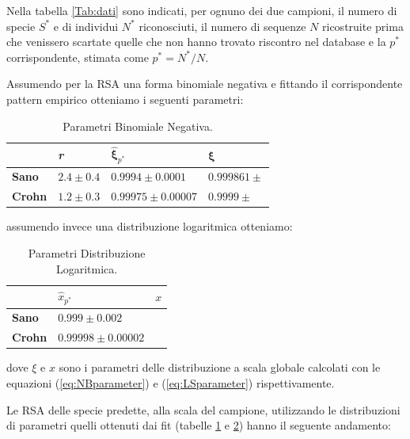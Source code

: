 Nella tabella \ref{Tab:dati} sono indicati, per ognuno dei due campioni, il numero di specie $S^*$ e di individui $N^*$ riconosciuti, il numero di sequenze $N$ ricostruite prima che venissero scartate quelle che non hanno trovato riscontro nel database e la $p^*$ corrispondente, stimata come $p^*=N^*/N$.


Assumendo per la RSA una forma binomiale negativa e fittando il corrispondente pattern empirico otteniamo i seguenti parametri:


\begin{table}[H]
\centering
\begin{tabular}{l|l|l|l|}
\cline{2-4}
                                     & \textit{r}    & $\mathbf{\hat \xi}_{p^*}$                & $\mathbf{\xi}$             \\ \hline
\multicolumn{1}{|l|}{\textbf{Sano}}  & $2.4 \pm 0.4$ & $0.9994 \pm 0.0001$ & $0.999861 \pm $ \\ \hline
\multicolumn{1}{|l|}{\textbf{Crohn}} & $1.2 \pm 0.3$ & $0.99975 \pm0.00007 $     & $0.9999 \pm $ \\ \hline
\end{tabular}
\caption{Parametri Binomiale Negativa.}
\label{Tab:parametriNB}
\end{table}

assumendo invece una distribuzione logaritmica otteniamo:

\begin{table}[H]
\centering
\begin{tabular}{l|l|l|}
\cline{2-3}
                                     & $\hat x_{p^*}$                    & $x$ \\ \hline
\multicolumn{1}{|l|}{\textbf{Sano}}  & $0.999 \pm 0.002$     &   \\ \hline
\multicolumn{1}{|l|}{\textbf{Crohn}} & $0.99998 \pm 0.00002$ &   \\ \hline
\end{tabular}
\caption{Parametri Distribuzione Logaritmica.}
\label{Tab:parametriLS}
\end{table}

dove $\xi$ e $x$ sono i parametri delle distribuzione a scala globale calcolati con le equazioni (\ref{eq:NBparameter}) e (\ref{eq:LSparameter}) rispettivamente.

Le RSA delle specie predette, alla scala del campione, utilizzando le distribuzioni di parametri quelli ottenuti dai fit (tabelle \ref{Tab:parametriNB} e \ref{Tab:parametriLS}) hanno il seguente andamento:

